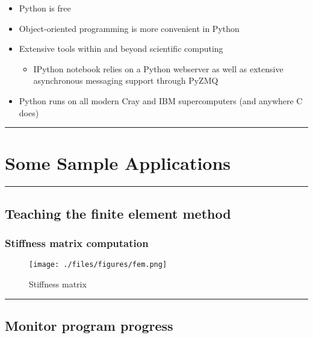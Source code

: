 \documentclass{article}
\begin{document}
\begin{itemize}
\itemsep1pt\parskip0pt
\item
  Python is free
\item
  Object-oriented programming is more convenient in Python
\item
  Extensive tools within and beyond scientific computing

  \begin{itemize}
  \itemsep1pt\parskip0pt
  \item
    IPython notebook relies on a Python webserver as well as extensive
    asynchronous messaging support through PyZMQ
  \end{itemize}
\item
  Python runs on all modern Cray and IBM supercomputers (and anywhere C
  does)
\end{itemize}

    \begin{center}\rule{3in}{0.4pt}\end{center}

\section{Some Sample Applications}\label{some-sample-applications}

    \begin{center}\rule{3in}{0.4pt}\end{center}

\subsection{Teaching the finite element
method}\label{teaching-the-finite-element-method}

\subsubsection{Stiffness matrix
computation}\label{stiffness-matrix-computation}

\begin{figure}[htbp]
\centering
\texttt{[image: ./files/figures/fem.png]}
\caption{Stiffness matrix}
\end{figure}

    \begin{center}\rule{3in}{0.4pt}\end{center}

\subsection{Monitor program progress}\label{monitor-program-progress}
\end{document}
